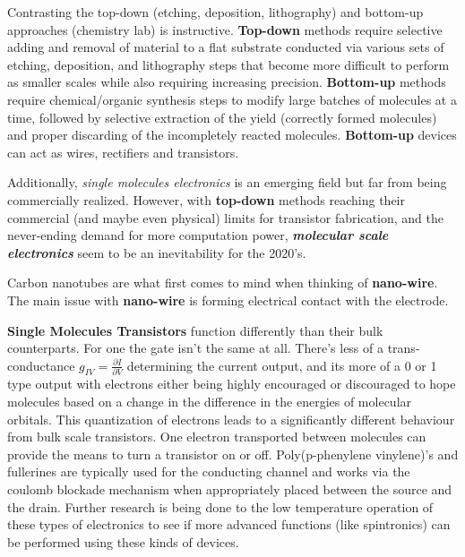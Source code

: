 \documentclass{article}
\newcounter{subsubsubsection}[subsubsection]
\begin{document}
Contrasting the top-down (etching, deposition, lithography) and bottom-up approaches (chemistry lab) is instructive. \textbf{Top-down} methods require selective adding and removal of material to a flat substrate conducted via various sets of etching, deposition, and lithography steps that become more difficult to perform as smaller scales while also requiring increasing precision. \textbf{Bottom-up} methods require chemical/organic synthesis steps to modify large batches of molecules at a time, followed by selective extraction of the yield (correctly formed molecules) and proper discarding of the incompletely reacted molecules. \textbf{Bottom-up} devices can act as wires, rectifiers and transistors. 

Additionally, \textit{single molecules electronics} is an emerging field but far from being commercially realized. However, with \textbf{top-down} methods reaching their commercial (and maybe even physical) limits for transistor fabrication, and the never-ending demand for more computation power, \textbf{\textit{molecular scale electronics}} seem to be an inevitability for the 2020's. 

\newpage


Carbon nanotubes are what first comes to mind when thinking of \textbf{nano-wire}. The main issue with \textbf{nano-wire} is forming electrical contact with the electrode. 

\textbf{Single Molecules Transistors} function differently than their bulk counterparts. For one the gate isn't the same at all. There's less of a trans-conductance \begin{math} g_{IV} = \frac{\partial{I}}{\partial{V}} \end{math} determining the current output, and its more of a 0 or 1 type output with electrons either being highly encouraged or discouraged to hope molecules based on a change in the difference in the energies of molecular orbitals. This quantization of electrons leads to a significantly different behaviour from bulk scale transistors. One electron transported between molecules can provide the means to turn a transistor on or off. Poly(p-phenylene vinylene)'s and fullerines are typically used for the conducting channel and works via the coulomb blockade mechanism when appropriately placed between the source and the drain. Further research is being done to the low temperature operation of these types of electronics to see if more advanced functions (like spintronics) can be performed using these kinds of devices. 
\end{document}

